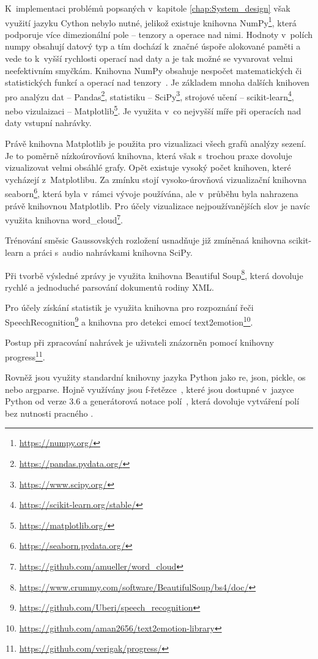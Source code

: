 K~implementaci problémů popsaných v~kapitole \ref{chap:System_design} však využití jazyku Cython nebylo nutné, jelikož existuje knihovna NumPy\footnote{\url{https://numpy.org/}}, která podporuje více dimezionální pole -- tenzory a operace nad nimi. Hodnoty v~polích numpy obsahují datový typ a tím dochází k~značné úspoře alokované paměti a vede to k~vyšší rychlosti operací nad daty a je tak možné se vyvarovat velmi neefektivním smyčkám. Knihovna NumPy obsahuje nespočet matematických či statistických funkcí a operací nad tenzory~\cite{Numpy}. Je základem mnoha dalších knihoven pro analýzu dat -- Pandas\footnote{\url{https://pandas.pydata.org/}}, statistiku -- SciPy\footnote{\url{https://www.scipy.org/}}, strojové učení -- scikit-learn\footnote{\url{https://scikit-learn.org/stable/}}, nebo vizulaizaci -- Matplotlib\footnote{\url{https://matplotlib.org/}}. Je využita v~co nejvyšší míře při operacích nad daty vstupní nahrávky.

Právě knihovna Matplotlib je použita pro vizualizaci všech grafů analýzy sezení. Je to poměrně nízkoúrovňová knihovna, která však s~trochou praxe dovoluje vizualizovat velmi obsáhlé grafy. Opět existuje vysoký počet knihoven, které vycházejí z~Matplotlibu. Za zmínku stojí vysoko-úrovňová vizualizační knihovna seaborn\footnote{\url{https://seaborn.pydata.org/}}, která byla v~rámci vývoje používána, ale v~průběhu byla nahrazena právě knihovnou Matplotlib. Pro účely vizualizace nejpoužívanějších slov je navíc využita knihovna word\_cloud\footnote{\url{https://github.com/amueller/word_cloud}}.

Trénování směsic Gaussovských rozložení usnadňuje již zmíněnaá knihovna scikit-learn a práci s~audio nahrávkami knihovna SciPy.

Při tvorbě výsledné zprávy je využita knihovna Beautiful Soup\footnote{\url{https://www.crummy.com/software/BeautifulSoup/bs4/doc/}}, která dovoluje rychlé a jednoduché parsování dokumentů rodiny XML.

Pro účely získání statistik je využita knihovna pro rozpoznání řeči SpeechRecognition\footnote{\url{https://github.com/Uberi/speech_recognition}} a knihovna pro detekci emocí text2emotion\footnote{\url{https://github.com/aman2656/text2emotion-library}}.

Postup při zpracování nahrávek je uživateli znázorněn pomocí knihovny progress\footnote{\url{https://github.com/verigak/progress/}}.

Rovněž jsou využity standardní knihovny jazyka Python jako re, json, pickle, os nebo argparse. Hojně využívány jsou   f-řetězce~\cite{python_f_string}, které jsou dostupné v~jazyce Python od verze 3.6 a generátorová notace polí~\cite{python_list_comprehension}, která dovoluje vytváření polí bez nutnosti pracného .


